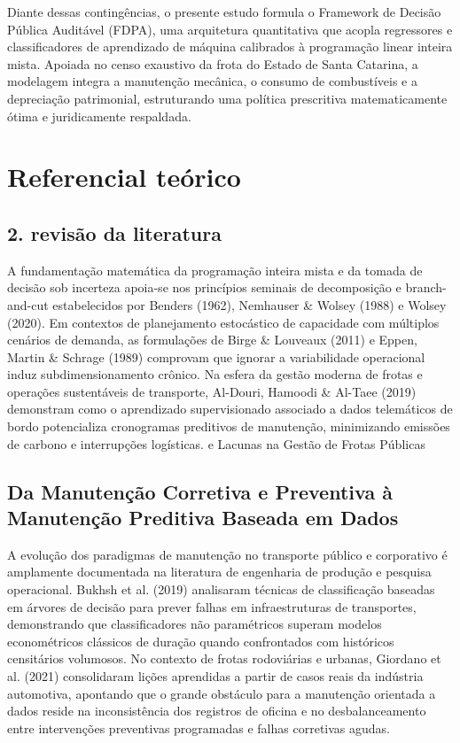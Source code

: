 \documentclass[12pt,a4paper]{article}
\begin{document}
Diante dessas contingências, o presente estudo formula o Framework de Decisão Pública Auditável (FDPA), uma arquitetura quantitativa que acopla regressores e classificadores de aprendizado de máquina calibrados à programação linear inteira mista. Apoiada no censo exaustivo da frota do Estado de Santa Catarina, a modelagem integra a manutenção mecânica, o consumo de combustíveis e a depreciação patrimonial, estruturando uma política prescritiva matematicamente ótima e juridicamente respaldada.


\section{Referencial teórico}


\subsection{2. revisão da literatura}

A fundamentação matemática da programação inteira mista e da tomada de decisão sob incerteza apoia-se nos princípios seminais de decomposição e branch-and-cut estabelecidos por Benders (1962), Nemhauser \& Wolsey (1988) e Wolsey (2020). Em contextos de planejamento estocástico de capacidade com múltiplos cenários de demanda, as formulações de Birge \& Louveaux (2011) e Eppen, Martin \& Schrage (1989) comprovam que ignorar a variabilidade operacional induz subdimensionamento crônico. Na esfera da gestão moderna de frotas e operações sustentáveis de transporte, Al-Douri, Hamoodi \& Al-Taee (2019) demonstram como o aprendizado supervisionado associado a dados telemáticos de bordo potencializa cronogramas preditivos de manutenção, minimizando emissões de carbono e interrupções logísticas. e Lacunas na Gestão de Frotas Públicas


\subsection{Da Manutenção Corretiva e Preventiva à Manutenção Preditiva Baseada em Dados}

A evolução dos paradigmas de manutenção no transporte público e corporativo é amplamente documentada na literatura de engenharia de produção e pesquisa operacional. Bukhsh et al. (2019) analisaram técnicas de classificação baseadas em árvores de decisão para prever falhas em infraestruturas de transportes, demonstrando que classificadores não paramétricos superam modelos econométricos clássicos de duração quando confrontados com históricos censitários volumosos. No contexto de frotas rodoviárias e urbanas, Giordano et al. (2021) consolidaram lições aprendidas a partir de casos reais da indústria automotiva, apontando que o grande obstáculo para a manutenção orientada a dados reside na inconsistência dos registros de oficina e no desbalanceamento entre intervenções preventivas programadas e falhas corretivas agudas.
\end{document}
